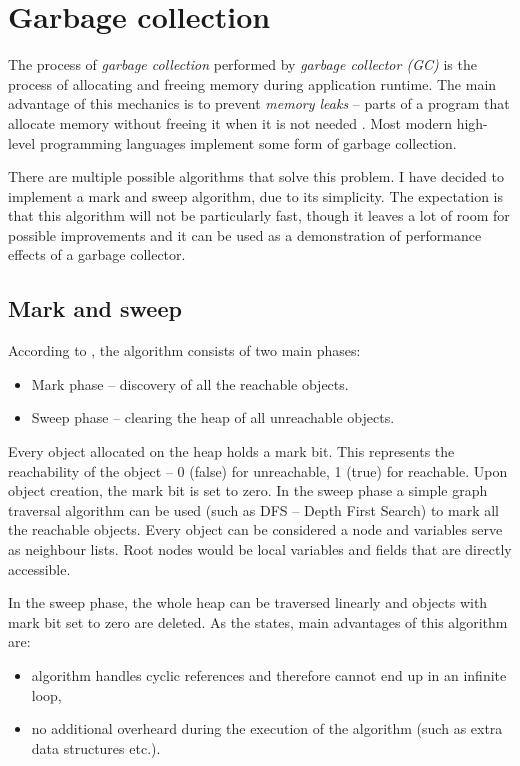 \documentclass[thesis=M,english]{FITthesis}[2019/12/23]
\begin{document}
\section{Garbage collection}
The process of \textit{garbage collection} performed by \textit{garbage collector (GC)} is the process of allocating and freeing
memory during application runtime. The main advantage of this mechanics is to prevent \textit{memory leaks} -- parts of a program
that allocate memory without freeing it when it is not needed \cite{memleaks-raygun}. Most modern high-level programming languages
implement some form of garbage collection.

There are multiple possible algorithms that solve this problem. I have decided to implement a mark and sweep algorithm, due to
its simplicity. The expectation is that this algorithm will not be particularly fast, though it leaves a lot of room for possible
improvements and it can be used as a demonstration of performance effects of a garbage collector.

\subsection{Mark and sweep}
\label{subsection:mark_and_sweep}
According to \cite{gc-ms}, the algorithm consists of two main phases:
\begin{itemize}
	\item Mark phase -- discovery of all the reachable objects.
	\item Sweep phase -- clearing the heap of all unreachable objects.
\end{itemize}

Every object allocated on the heap holds a mark bit. This represents the reachability of the object -- 0 (false) for
unreachable, 1 (true) for reachable. Upon object creation, the mark bit is set to zero. In the sweep phase a simple
graph traversal algorithm can be used (such as DFS -- Depth First Search) to mark all the reachable objects. Every
object can be considered a node and variables serve as neighbour lists. Root nodes would be local variables and fields
that are directly accessible.

In the sweep phase, the whole heap can be traversed linearly and objects with mark bit set to zero are deleted. As the \cite{gc-ms}
states, main advantages of this algorithm are:
\begin{itemize}
	\item algorithm handles cyclic references and therefore cannot end up in an infinite loop,
	\item no additional overheard during the execution of the algorithm (such as extra data structures etc.).
\end{itemize}
\end{document}
